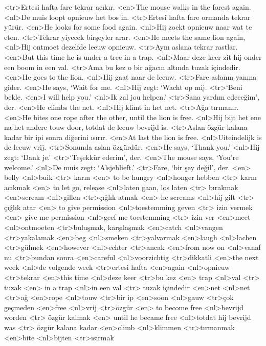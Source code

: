 <tr>Ertesi hafta fare tekrar acıkır.
<en>The mouse walks in the forest again.
<nl>De muis loopt opnieuw het bos in.
<tr>Ertesi hafta fare ormanda tekrar yürür.
<en>He looks for some food again.
<nl>Hij zoekt opnieuw naar wat te eten. 
<tr>Tekrar yiyecek birşeyler arar.
<en>He meets the same lion again,
<nl>Hij ontmoet dezelfde leeuw opnieuw.
<tr>Aynı aslana tekrar rastlar.
<en>But this time he is under a tree in a trap.
<nl>Maar deze keer zit hij onder een boom in een val.
<tr>Ama bu kez o bir ağacın altında tuzak içindedir. 
<en>He goes to the lion.
<nl>Hij gaat naar de leeuw.
<tr>Fare aslanın yanına gider.
<en>He says, `Wait for me.
<nl>Hij zegt: `Wacht op mij.
<tr>`Beni bekle.
<en>I will help you.’
<nl>Ik zal jou helpen.' 
<tr>Sana yardım edeceğim', der.
<en>He climbs the net.
<nl>Hij klimt in het net.
<tr>Ağa tırmanır.
<en>He bites one rope after the other,  until the lion is free.
<nl>Hij bijt het ene  na het andere touw door, totdat de leeuw bevrijd is.
<tr>Aslan özgür kalana kadar bir ipi sonra diğerini ısırır. 
<en>At last the lion is free.
<nl>Uiteindelijk is de leeuw vrij.
<tr>Sonunda aslan özgürdür.
<en>He says, `Thank you.'
<nl>Hij zegt: `Dank je.'
<tr>`Teşekkür ederim',  der.
<en>The mouse says, `You’re welcome.'
<nl>De muis zegt: `Alsjeblieft.'
<tr>Fare, `bir şey değil', der.
<en> belly 
<nl>buik 
<tr> karın 
<en> to be hungry 
<nl>honger hebben 
<tr> karnı acıkmak 
<en> to let go, release 
<nl>laten gaan, los laten 
<tr> bırakmak
<en>scream
<nl>gillen
<tr>çığlık atmak
<en> he screams 
<nl>hij gilt 
<tr> çığlık atar
<en> to give permission 
<nl>toestemming geven 
<tr> izin vermek 
<en> give me permission 
<nl>geef me toestemming 
<tr> izin ver 
<en>meet
<nl>ontmoeten
<tr>buluşmak, karşılaşmak
<en>catch
<nl>vangen
<tr>yakalamak
<en>beg
<nl>smeken
<tr>yalvarmak
<en>laugh
<nl>lachen
<tr>gülmek
<en>however 
<nl>echter 
<tr>ancak
<en>from now on
<nl>vanaf nu
<tr>bundan sonra
<en>careful
<nl>voorzichtig
<tr>dikkatli
<en>the next week
<nl>de volgende week
<tr>ertesi hafta
<en>again
<nl>opnieuw
<tr>tekrar
<en>this time
<nl>deze keer
<tr>bu kez
<en> trap 
<nl>val 
<tr> tuzak 
<en> in a trap 
<nl>in een val 
<tr> tuzak içindedir
<en>net
<nl>net
<tr>ağ
<en>rope
<nl>touw
<tr>bir ip
<en>soon 
<nl>gauw
<tr>çok geçmeden
<en>free
<nl>vrij
<tr>özgür
<en> to become free 
<nl>bevrijd worden 
<tr> özgür kalmak  
<en> until he became free 
<nl>totdat hij bevrijd was 
<tr> özgür kalana kadar 
<en>climb
<nl>klimmen
<tr>tırmanmak
<en>bite
<nl>bijten
<tr>ısırmak

